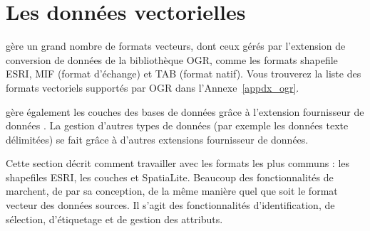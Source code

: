 
\chapter{Les données vectorielles}\label{label_workingvector}

\qg gère un grand nombre de formats vecteurs, dont ceux gérés par l'extension de conversion de données de la bibliothèque OGR, comme les formats shapefile ESRI, \map MIF (format d'échange) et  \map TAB (format natif).
Vous trouverez la liste des formats vectoriels supportés par OGR dans l'Annexe~\ref{appdx_ogr}.

\qg gère également les couches \pg {} des bases de données \psq grâce à l'extension fournisseur de données \psq. La gestion d'autres types de données (par exemple les données texte délimitées) se fait grâce à d'autres extensions fournisseur de données.

Cette section décrit comment travailler avec les formats les plus communs : les shapefiles ESRI, les couches \pg et SpatiaLite. Beaucoup des fonctionnalités de \qg marchent, de par sa conception, de la même manière quel que soit le format vecteur des données sources. Il s'agit des fonctionnalités d'identification, de sélection, d'étiquetage et de gestion des attributs.

